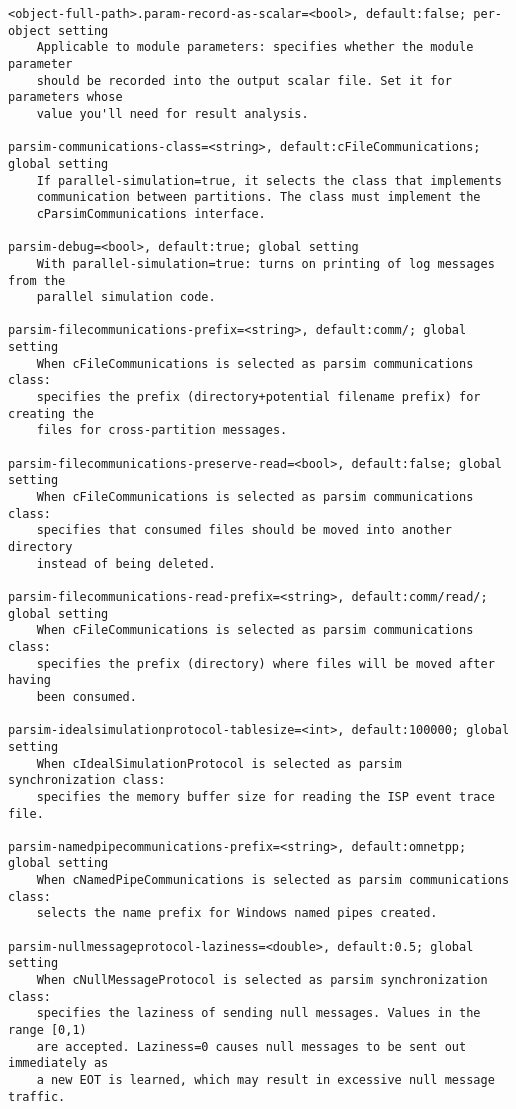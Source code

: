\begin{verbatim}
<object-full-path>.param-record-as-scalar=<bool>, default:false; per-object setting
    Applicable to module parameters: specifies whether the module parameter
    should be recorded into the output scalar file. Set it for parameters whose
    value you'll need for result analysis.

parsim-communications-class=<string>, default:cFileCommunications; global setting
    If parallel-simulation=true, it selects the class that implements
    communication between partitions. The class must implement the
    cParsimCommunications interface.

parsim-debug=<bool>, default:true; global setting
    With parallel-simulation=true: turns on printing of log messages from the
    parallel simulation code.

parsim-filecommunications-prefix=<string>, default:comm/; global setting
    When cFileCommunications is selected as parsim communications class:
    specifies the prefix (directory+potential filename prefix) for creating the
    files for cross-partition messages.

parsim-filecommunications-preserve-read=<bool>, default:false; global setting
    When cFileCommunications is selected as parsim communications class:
    specifies that consumed files should be moved into another directory
    instead of being deleted.

parsim-filecommunications-read-prefix=<string>, default:comm/read/; global setting
    When cFileCommunications is selected as parsim communications class:
    specifies the prefix (directory) where files will be moved after having
    been consumed.

parsim-idealsimulationprotocol-tablesize=<int>, default:100000; global setting
    When cIdealSimulationProtocol is selected as parsim synchronization class:
    specifies the memory buffer size for reading the ISP event trace file.

parsim-namedpipecommunications-prefix=<string>, default:omnetpp; global setting
    When cNamedPipeCommunications is selected as parsim communications class:
    selects the name prefix for Windows named pipes created.

parsim-nullmessageprotocol-laziness=<double>, default:0.5; global setting
    When cNullMessageProtocol is selected as parsim synchronization class:
    specifies the laziness of sending null messages. Values in the range [0,1)
    are accepted. Laziness=0 causes null messages to be sent out immediately as
    a new EOT is learned, which may result in excessive null message traffic.


\end{verbatim}
